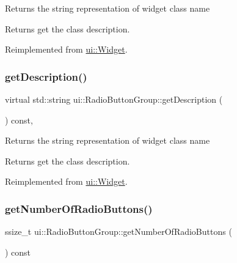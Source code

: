 Returns the string representation of widget class name \begin{DoxyReturn}{Returns}
get the class description. 
\end{DoxyReturn}


Reimplemented from \hyperlink{classui_1_1Widget_ad85abdaa9133dc6b8efc32670ae9b93f}{ui\+::\+Widget}.

\mbox{\label{classui_1_1RadioButtonGroup_aed6a80ca4ca4cb6a91efa19de06829ae}} 
\subsubsection{\texorpdfstring{get\+Description()}{getDescription()}\hspace{0.1cm}{\footnotesize\ttfamily [2/2]}}
{\footnotesize\ttfamily virtual std\+::string ui\+::\+Radio\+Button\+Group\+::get\+Description (\begin{DoxyParamCaption}{ }\end{DoxyParamCaption}) const\hspace{0.3cm}{\ttfamily [override]}, {\ttfamily [virtual]}}

Returns the string representation of widget class name \begin{DoxyReturn}{Returns}
get the class description. 
\end{DoxyReturn}


Reimplemented from \hyperlink{classui_1_1Widget_ad85abdaa9133dc6b8efc32670ae9b93f}{ui\+::\+Widget}.

\mbox{\label{classui_1_1RadioButtonGroup_a673d0fac47fbe688d10ffa361d8ae980}} 
\subsubsection{\texorpdfstring{get\+Number\+Of\+Radio\+Buttons()}{getNumberOfRadioButtons()}\hspace{0.1cm}{\footnotesize\ttfamily [1/2]}}
{\footnotesize\ttfamily ssize\+\_\+t ui\+::\+Radio\+Button\+Group\+::get\+Number\+Of\+Radio\+Buttons (\begin{DoxyParamCaption}{ }\end{DoxyParamCaption}) const}

